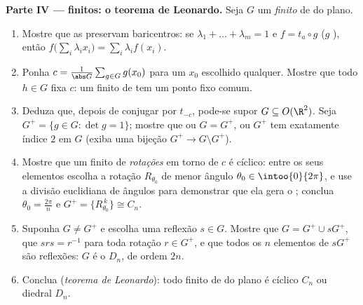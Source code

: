 \begin{problem}
\medskip
\noindent\textbf{Parte IV ---  finitos: o teorema de
Leonardo.} Seja $G$ um  \emph{finito} de  do plano.
\begin{enumerate}[resume]
  \item Mostre que as  preservam baricentros: se $\lambda_1 + \dots + \lambda_m = 1$ e
        $f = t_a \circ
        g$ ($g$ ), então $f\bigl(\sum_i \lambda_i
        x_i\bigr) = \sum_i \lambda_i f(x_i)$.
  \item Ponha $c = \frac{1}{\abs G}\sum_{g \in G} g(x_0)$ para um $x_0$ escolhido qualquer. Mostre que
        todo $h \in G$ fixa $c$: um  finito de  tem
        um ponto fixo comum.
  \item Deduza que, depois de conjugar por $t_{-c}$, pode-se supor
        $G \subseteq O(\R^2)$. Seja $G^{+} = \{g \in G :
        \det g = 1\}$; mostre que ou $G = G^{+}$, ou $G^{+}$ tem
        exatamente índice $2$ em $G$ (exiba uma bijeção $G^+
        \to G \setminus G^+$).
  \item Mostre que um  finito de \emph{rotações} em torno de
        $c$ é cíclico: entre os seus elementos escolha a rotação
        $R_{\theta_0}$ de menor ângulo $\theta_0 \in
        \intoo{0}{2\pi}$, e use a divisão euclidiana de
        ângulos para demonstrar que ela gera o ; conclua $\theta_0 =
        \frac{2\pi}n$
        e $G^{+} = \{R_{\theta_0}^{\,k}\} \cong
        C_n$.
  \item Suponha $G \neq G^{+}$ e escolha uma reflexão $s \in G$. Mostre que
        $G = G^{+} \cup sG^{+}$, que $s r s = r^{-1}$ para toda rotação $r \in G^{+}$, e que todos os
        $n$ elementos de $sG^{+}$ são reflexões: $G$ é o \emph{} $D_n$, de ordem $2n$.
  \item Conclua (\emph{teorema de Leonardo}): todo  finito de
         do plano é cíclico $C_n$ ou diedral $D_n$.
\end{enumerate}


\end{problem}
